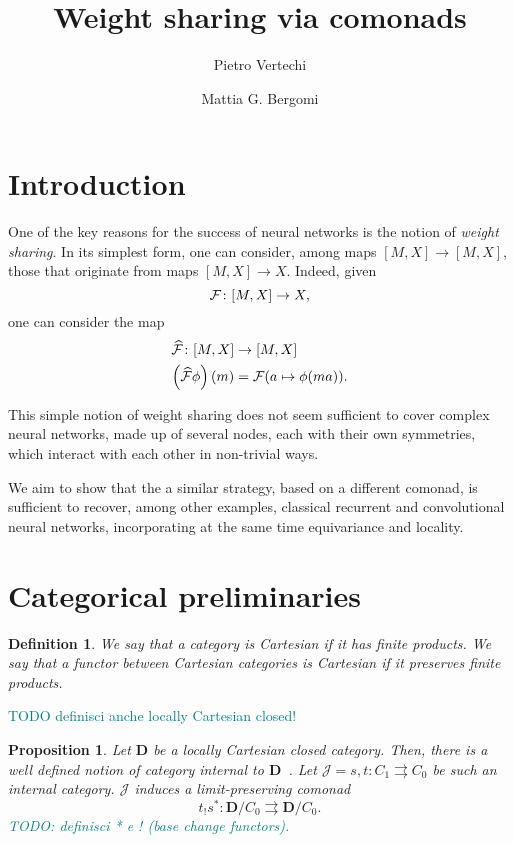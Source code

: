 \documentclass[12pt]{article}
\title{Weight sharing via comonads}
\author{
    Pietro Vertechi \and Mattia G. Bergomi
}
\date{}
\newtheorem{definition}{Definition}
\newtheorem{proposition}{Proposition}
\newcommand{\pietro}[1]{\textcolor{teal}{#1}}
\newcommand{\DCat}{{\mathbf{D}}}
\newcommand{\JCat}{{\mathcal{J}}}
\begin{document}
\maketitle
\begin{abstract}
\end{abstract}

\section{Introduction}

One of the key reasons for the success of neural networks is the notion of {\em weight sharing}. In its simplest form, one can consider, among maps $[M, X] \rightarrow [M, X]$, those that originate from maps $[M, X] \rightarrow X$. Indeed, given
\begin{equation*}
    {\cal F} \colon [M, X] \rightarrow X,
\end{equation*}
one can consider the map
\begin{align*}
    \widehat{\cal F} \colon [M, X]       & \rightarrow [M, X]              \\
    \left(\widehat{\cal F}\phi\right)(m) & = {\cal F}(a \mapsto \phi(ma)).
\end{align*}

This simple notion of weight sharing does not seem sufficient to cover complex neural networks, made up of several nodes, each with their own symmetries, which interact with each other in non-trivial ways.

We aim to show that the a similar strategy, based on a different comonad, is sufficient to recover, among other examples, classical recurrent and convolutional neural networks, incorporating at the same time equivariance and locality.

\section{Categorical preliminaries}

\begin{definition}\label{def:cartesian_category}
    We say that a category is {\em Cartesian} if it has finite products. We say that a functor between Cartesian categories is {\em Cartesian} if it preserves finite products.
\end{definition}

\pietro{TODO definisci anche locally Cartesian closed!}

\begin{proposition}\label{prop:internal_category_comonad}
    Let $\DCat$ be a locally Cartesian closed category. Then, there is a well defined notion of category {\em internal} to $\DCat$~\cite{mac2013categories}.
    Let $\JCat = s, t \colon C_1 \rightrightarrows C_0$ be such an internal category. $\JCat$ induces a limit-preserving comonad
    \begin{equation*}
        t_!s^*\colon \DCat/C_0 \rightrightarrows \DCat/C_0.
    \end{equation*}
    \pietro{TODO: definisci * e ! (base change functors).}
\end{proposition}
\end{document}
